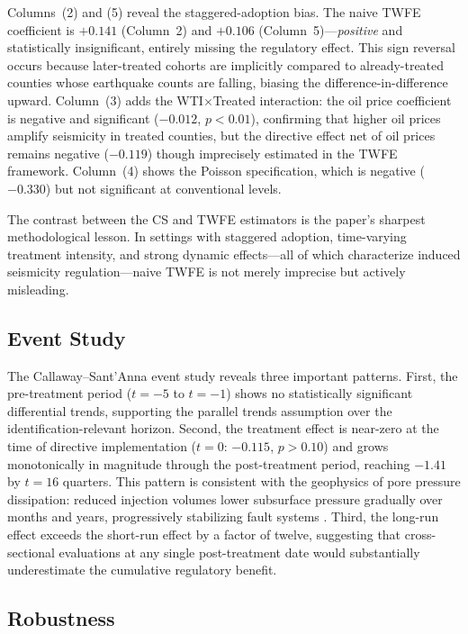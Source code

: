 \documentclass[12pt]{article}
\begin{document}
Columns~(2) and (5) reveal the staggered-adoption bias. The naive TWFE coefficient is $+0.141$ (Column~2) and $+0.106$ (Column~5)---\textit{positive} and statistically insignificant, entirely missing the regulatory effect. This sign reversal occurs because later-treated cohorts are implicitly compared to already-treated counties whose earthquake counts are falling, biasing the difference-in-difference upward. Column~(3) adds the WTI$\times$Treated interaction: the oil price coefficient is negative and significant ($-0.012$, $p < 0.01$), confirming that higher oil prices amplify seismicity in treated counties, but the directive effect net of oil prices remains negative ($-0.119$) though imprecisely estimated in the TWFE framework. Column~(4) shows the Poisson specification, which is negative ($-0.330$) but not significant at conventional levels.

The contrast between the CS and TWFE estimators is the paper's sharpest methodological lesson. In settings with staggered adoption, time-varying treatment intensity, and strong dynamic effects---all of which characterize induced seismicity regulation---naive TWFE is not merely imprecise but actively misleading.

\subsection{Event Study}

The Callaway--Sant'Anna event study reveals three important patterns. First, the pre-treatment period ($t = -5$ to $t = -1$) shows no statistically significant differential trends, supporting the parallel trends assumption over the identification-relevant horizon. Second, the treatment effect is near-zero at the time of directive implementation ($t = 0$: $-0.115$, $p > 0.10$) and grows monotonically in magnitude through the post-treatment period, reaching $-1.41$ by $t = 16$ quarters. This pattern is consistent with the geophysics of pore pressure dissipation: reduced injection volumes lower subsurface pressure gradually over months and years, progressively stabilizing fault systems \citep{langenbruch2016will}. Third, the long-run effect exceeds the short-run effect by a factor of twelve, suggesting that cross-sectional evaluations at any single post-treatment date would substantially underestimate the cumulative regulatory benefit.

\subsection{Robustness}
\end{document}
